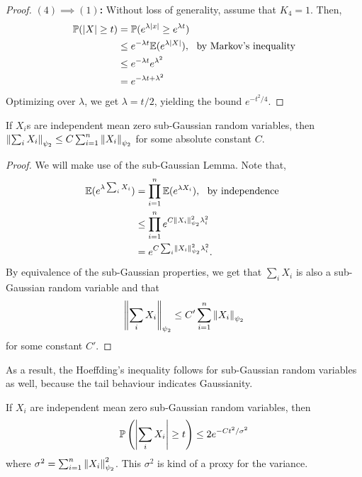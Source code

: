 \documentclass[12pt]{article}
\begin{document}
\begin{proof}
    \textbf{$(4) \implies (1)$:} Without loss of generality, assume that $K_4 = 1$. Then,
    \begin{align*}
        \mathbb{P}(\left\lvert X \right\rvert \geq t)
         & = \mathbb{P}(e^{\lambda \left\lvert x \right\rvert} \geq e^{\lambda t})                               \\
         & \leq e^{-\lambda t} \mathbb{E}(e^{\lambda \left\lvert X \right\rvert}), \ \text{ by Markov's inequality} \\
         & \leq e^{-\lambda t} e^{\lambda^2}                                             \\
         & = e^{-\lambda t + \lambda^2}
    \end{align*}
    \noindent Optimizing over $\lambda$, we get $\lambda = t/2$, yielding the bound $e^{-t^2/4}$.
\end{proof}

\begin{lemmabox}
    If $X_i$s are independent mean zero sub-Gaussian random variables, then $\left\Vert \sum_i X_i \right\Vert_{\psi_2} \leq C \sum_{i=1}^n \left\Vert X_i \right\Vert_{\psi_2}$ for some absolute constant $C$.
\end{lemmabox}

\begin{proof}
    We will make use of the sub-Gaussian Lemma. Note that,
    \begin{align*}
        \mathbb{E}(e^{\lambda \sum_i X_i})
         & = \prod_{i=1}^n \mathbb{E}(e^{\lambda X_i}), \ \text{ by independence } \\
         & \leq \prod_{i=1}^n e^{C \left\Vert X_i \right\Vert_{\psi_2}^2 \lambda_i^2}      \\
         & = e^{C \sum_i \left\Vert X_i \right\Vert_{\psi_2}^2 \lambda_i^2}.
    \end{align*}
    \noindent By equivalence of the sub-Gaussian properties, we get that $\sum_{i} X_i$ is also a sub-Gaussian random variable and that
    \begin{equation*}
        \left\Vert \sum_i X_i \right\Vert_{\psi_2} \leq C' \sum_{i=1}^n \left\Vert X_i \right\Vert_{\psi_2}
    \end{equation*}
    \noindent for some constant $C'$.
\end{proof}

As a result, the Hoeffding's inequality follows for sub-Gaussian random variables as well, because the tail behaviour indicates Gaussianity.

\begin{theorembox}
    If $X_i$ are independent mean zero sub-Gaussian random variables, then
    \begin{equation*}
        \mathbb{P}\left(\left\lvert \sum_i X_i \right\rvert \geq t\right) \leq 2e^{-C t^2/\sigma^2}
    \end{equation*}
    \noindent where $\sigma^2 = \sum_{i=1}^n \left\Vert X_i \right\Vert_{\psi_2}^2$. This $\sigma^2$ is kind of a proxy for the variance.
\end{theorembox}
\end{document}
